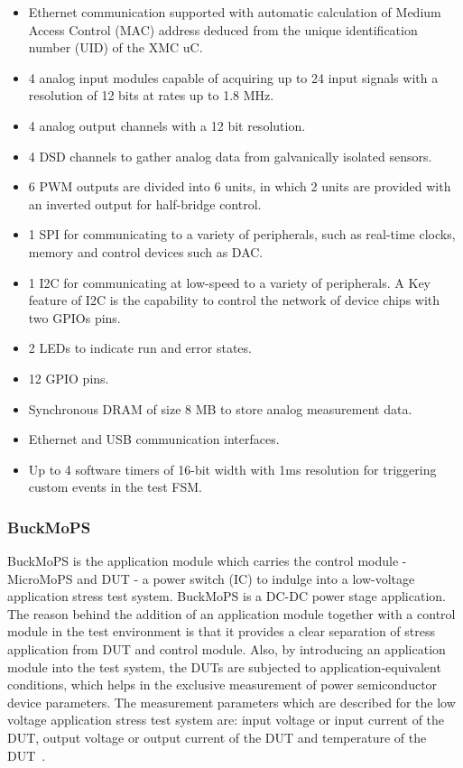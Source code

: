 \begin{itemize}
	\item Ethernet communication supported with automatic calculation of Medium Access Control (MAC) address deduced from the unique identification number (UID) of the XMC \gls{uC}.
	\item 4 analog input modules capable of acquiring up to 24 input signals with a resolution of 12 bits at rates up to 1.8 MHz.
	\item 4 analog output channels with a 12 bit resolution.
	\item 4 \gls{DSD} channels to gather analog data from galvanically isolated sensors.
	\item 6 \gls{PWM} outputs are divided into 6 units, in which 2 units are provided with an inverted output for half-bridge control.
	\item 1 \gls{SPI} for communicating to a variety of peripherals, such as real-time clocks, memory and control devices such as DAC.	
	\item 1 \gls{I2C} for communicating at low-speed to a variety of peripherals.
			A Key feature of I2C is the capability to control the network of device chips with two \glspl{GPIO} pins.  
	\item 2 \glspl{LED} to indicate run and error states.
	\item 12 \gls{GPIO} pins.
	\item Synchronous DRAM of size 8 MB to store analog measurement data.
	\item Ethernet and \gls{USB} communication interfaces.
	\item Up to 4 software timers of 16-bit width with 1ms resolution for triggering custom events in the test \gls{FSM}.
\end{itemize}

\subsubsection{BuckMoPS}\label{sec:BuckMoPS}
BuckMoPS is the application module which carries the control module - MicroMoPS and DUT - a power switch (IC) to indulge into a low-voltage application stress test system.
BuckMoPS is a DC-DC power stage application.  
The reason behind the addition of an application module together with a control module in the test environment is that it provides a clear separation of stress application from \acrshort{DUT} and control module. 
Also, by introducing an application module into the test system, the \acrshort{DUT}s are subjected to application-equivalent conditions, which helps in the exclusive measurement of power semiconductor device parameters. 
The measurement parameters which are described for the low voltage application stress test system are: input voltage or input current of the \acrshort{DUT}, output voltage or output current of the \acrshort{DUT} and temperature of the \acrshort{DUT}~\cite{Sleik2018a}.   

